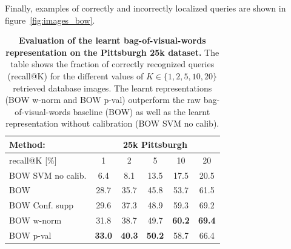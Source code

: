     Finally, examples of correctly and incorrectly localized queries are shown in figure~\ref{fig:images_bow}. 
%
    \begin{table}[]
      \begin{centering}     
      \begin{tabularx}{0.915\linewidth}{|l|c c c c c|}
        \hline 
        \rowcolor{maroon!50}
        Method: & \multicolumn{5}{c|}{25k Pittsburgh} \\
        \hline 
        \hline 
        \rowcolor{maroon!50}
        recall@K [$\%$] & 1 & 2 & 5 & 10 & 20 \\
        \hline
        \rowcolor{maroon!10}
          \rowcolor{maroon!10}
        BOW SVM no calib.   & 6.4   & 8.1   & 13.5  & 17.5  & 20.5 \\
          \rowcolor{maroon!10}
        BOW           & 28.7  & 35.7  & 45.8 & 53.7   & 61.5 \\
          \rowcolor{maroon!10}
        
        {BOW  Conf. supp~\cite{Knopp2010}}  & {29.6}  
                                        & {37.3}  
                                        & {48.9} 
                                        & {59.3}   
                                        & {69.2}  \\
          \rowcolor{maroon!10}
        BOW w-norm                      & 31.8    
                                        & 38.7  
                                        & 49.7  
                                        & \textbf{60.2}  
                                        & \textbf{69.4} \\
          \rowcolor{maroon!10}
        BOW p-val                       & \textbf{33.0}  
                                        & \textbf{40.3}  
                                        & \textbf{50.2} 
                                        & 58.7   
                                        & 66.4 \\
        \hline
      \end{tabularx}
      \caption{ 
        \textbf{Evaluation of the learnt bag-of-visual-words representation on the Pittsburgh 25k dataset.}
        The table shows the fraction of correctly recognized queries (recall@K) for the different values of $K\in\{1,2,5,10,20\}$ retrieved database images. 
        The learnt representations (BOW w-norm and BOW p-val) outperform the raw bag-of-visual-words baseline (BOW) as well as the learnt representation without calibration (BOW SVM no calib).  
      }
      \label{tab:recallBOW}
      \end{centering}
    \end{table}
